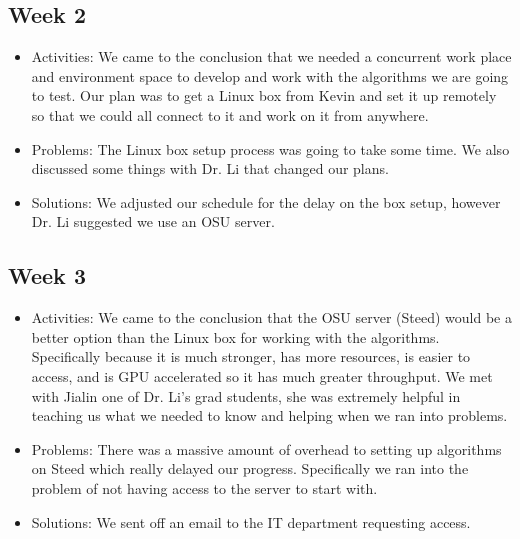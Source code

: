 \documentclass[10pt,draftclsnofoot,onecolumn,journal,compsoc]{IEEEtran}
\begin{document}
\subsection{Week 2}
\begin{itemize}
\item Activities: 
We came to the conclusion that we needed a concurrent work place and environment space to develop and work with the algorithms we are going to test. Our plan was to get a Linux box from Kevin and set it up remotely so that we could all connect to it and work on it from anywhere. 
\item Problems: 
The Linux box setup process was going to take some time. We also discussed some things with Dr. Li that changed our plans.
\item Solutions: 
We adjusted our schedule for the delay on the box setup, however Dr. Li suggested we use an OSU server. 
\end{itemize}

\subsection{Week 3}
\begin{itemize}
\item Activities: 
We came to the conclusion that the OSU server (Steed) would be a better option than the Linux box for working with the algorithms. Specifically because it is much stronger, has more resources, is easier to access, and is GPU accelerated so it has much greater throughput. We met with Jialin one of Dr. Li's grad students, she was extremely helpful in teaching us what we needed to know and helping when we ran into problems. 
\item Problems: 
There was a massive amount of overhead to setting up algorithms on Steed which really delayed our progress. Specifically we ran into the problem of not having access to the server to start with.
\item Solutions: 
We sent off an email to the IT department requesting access. 
\end{itemize}
\end{document}
